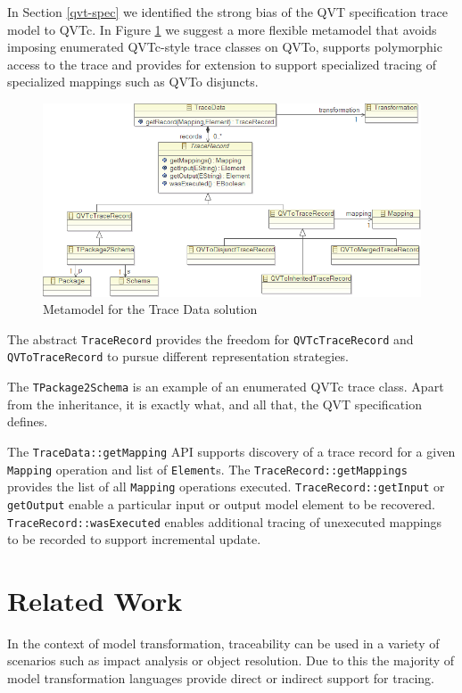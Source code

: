 \documentclass[runningheads,a4paper]{llncs}
\begin{document}
In Section \ref{qvt-spec} we identified the strong bias of the QVT specification trace model to QVTc. In Figure \ref{fig:TraceDataMM} we suggest a more flexible metamodel that avoids imposing enumerated QVTc-style trace classes on QVTo, supports polymorphic access to the trace and provides for extension to support specialized tracing of specialized mappings such as QVTo disjuncts. 
\begin{figure}
  \begin{center}
    \includegraphics[width=4.5in]{TraceData.png}
  \end{center}
  \caption{Metamodel for the Trace Data solution}
  \label{fig:TraceDataMM}
\end{figure}

The abstract \verb|TraceRecord| provides the freedom for \verb|QVTcTraceRecord| and \verb|QVToTraceRecord| to pursue different representation strategies.

The \verb|TPackage2Schema| is an example of an enumerated QVTc trace class. Apart from the inheritance, it is exactly what, and all that, the QVT specification defines.

The \verb|TraceData::getMapping| API supports discovery of a trace record for a given  \verb|Mapping| operation and list of  \verb|Element|s. The  \verb|TraceRecord::getMappings| provides the list of all  \verb|Mapping| operations executed.  \verb|TraceRecord::getInput| or  \verb|getOutput| enable a particular input or output model element to be recovered.  \verb|TraceRecord::wasExecuted| enables additional tracing of unexecuted mappings to be recorded to support incremental update. 

\section{Related Work}\label{related}

In the context of model transformation, traceability can be used in a variety of
scenarios such as impact analysis or object resolution. Due to this the majority
of model transformation languages provide direct or indirect support for
tracing.
\end{document}
